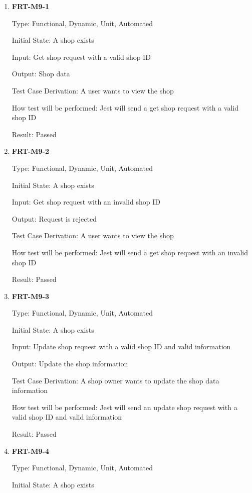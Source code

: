 \documentclass[12pt, titlepage]{article}
\begin{document}
\begin{enumerate}

	\item \textbf{FRT-M9-1}

	      Type: Functional, Dynamic, Unit, Automated

	      Initial State: A shop exists

	      Input: Get shop request with a valid shop ID

	      Output: Shop data

	      Test Case Derivation: A user wants to view the shop

	      How test will be performed: Jest will send a get shop request with a valid shop ID

	      Result: Passed

	\item \textbf{FRT-M9-2}

	      Type: Functional, Dynamic, Unit, Automated

	      Initial State: A shop exists

	      Input: Get shop request with an invalid shop ID

	      Output: Request is rejected

	      Test Case Derivation: A user wants to view the shop

	      How test will be performed: Jest will send a get shop request with an invalid shop ID

	      Result: Passed

	\item \textbf{FRT-M9-3}

	      Type: Functional, Dynamic, Unit, Automated

	      Initial State: A shop exists

	      Input: Update shop request with a valid shop ID and valid information

	      Output: Update the shop information

	      Test Case Derivation: A shop owner wants to update the shop data information

	      How test will be performed: Jest will send an update shop request with a valid shop ID and valid
	      information

	      Result: Passed

	\item \textbf{FRT-M9-4}

	      Type: Functional, Dynamic, Unit, Automated

	      Initial State: A shop exists


\end{enumerate}
\end{document}
